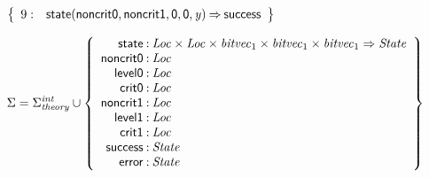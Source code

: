 \documentclass[a4paper]{article}
\def\lthtmlcheckvsize{\ifdim\ht\sizebox<\vsize 
  \ifdim\wd\sizebox<\hsize\expandafter\hfill\fi \expandafter\vfill
  \else\expandafter\vss\fi}%
\begin{document}
{\newpage\clearpage
{}%
$\displaystyle \left\{
\begin{array}{rr@{\>}c@{\>}ll}
\mathrm{9} : 
 & \mathsf{state}(\mathsf{noncrit0},\mathsf{noncrit1},\mathsf{0},\mathsf{0},\mathit{y})
 & \Rightarrow 
 & \mathsf{success}\\
\par
\end{array}
\right\}
$%
\lthtmlindisplaymathZ
\lthtmlcheckvsize\clearpage}

{\newpage\clearpage
{}%
$\displaystyle \Sigma = 
\Sigma^{\mathit{int}}_{\mathit{theory}}\cup\left\{
\begin{array}{r@{\>}c@{\>}l}
\mathsf{state} & : & \mathit{Loc} \times \mathit{Loc} \times \mathit{bitvec}_{1} \times \mathit{bitvec}_{1} \times \mathit{bitvec}_{1} \Rightarrow \mathit{State}\\
\mathsf{noncrit0} & : & \mathit{Loc}\\
\mathsf{level0} & : & \mathit{Loc}\\
\mathsf{crit0} & : & \mathit{Loc}\\
\mathsf{noncrit1} & : & \mathit{Loc}\\
\mathsf{level1} & : & \mathit{Loc}\\
\mathsf{crit1} & : & \mathit{Loc}\\
\mathsf{success} & : & \mathit{State}\\
\mathsf{error} & : & \mathit{State}\\
\end{array}
\right\}
$%
\lthtmlindisplaymathZ
\lthtmlcheckvsize\clearpage}
\end{document}
